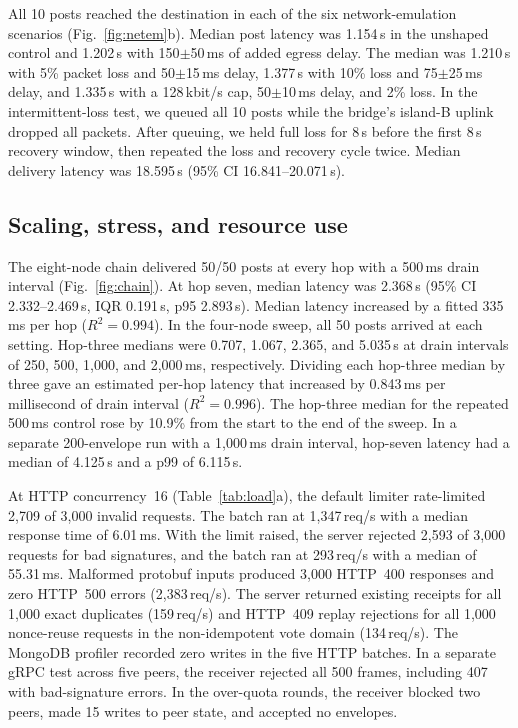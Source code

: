 \documentclass[conference,a4paper,10pt]{IEEEtran}
\begin{document}
All 10 posts reached the destination in each of the six network-emulation scenarios (Fig.~\ref{fig:netem}b). Median post latency was 1.154\,s in the unshaped control and 1.202\,s with 150$\pm$50\,ms of added egress delay. The median was 1.210\,s with 5\% packet loss and 50$\pm$15\,ms delay, 1.377\,s with 10\% loss and 75$\pm$25\,ms delay, and 1.335\,s with a 128\,kbit/s cap, 50$\pm$10\,ms delay, and 2\% loss. In the intermittent-loss test, we queued all 10 posts while the bridge's island-B uplink dropped all packets. After queuing, we held full loss for 8\,s before the first 8\,s recovery window, then repeated the loss and recovery cycle twice. Median delivery latency was 18.595\,s (95\% CI 16.841--20.071\,s).

\subsection{Scaling, stress, and resource use}

The eight-node chain delivered 50/50 posts at every hop with a 500\,ms drain interval (Fig.~\ref{fig:chain}). At hop seven, median latency was 2.368\,s (95\% CI 2.332--2.469\,s, IQR 0.191\,s, p95 2.893\,s). Median latency increased by a fitted 335\,ms per hop ($R^2 = 0.994$). In the four-node sweep, all 50 posts arrived at each setting. Hop-three medians were 0.707, 1.067, 2.365, and 5.035\,s at drain intervals of 250, 500, 1,000, and 2,000\,ms, respectively. Dividing each hop-three median by three gave an estimated per-hop latency that increased by 0.843\,ms per millisecond of drain interval ($R^2 = 0.996$). The hop-three median for the repeated 500\,ms control rose by 10.9\% from the start to the end of the sweep. In a separate 200-envelope run with a 1,000\,ms drain interval, hop-seven latency had a median of 4.125\,s and a p99 of 6.115\,s.

At HTTP concurrency~16 (Table~\ref{tab:load}a), the default limiter rate-limited 2,709 of 3,000 invalid requests. The batch ran at 1,347\,req/s with a median response time of 6.01\,ms. With the limit raised, the server rejected 2,593 of 3,000 requests for bad signatures, and the batch ran at 293\,req/s with a median of 55.31\,ms. Malformed protobuf inputs produced 3,000 HTTP~400 responses and zero HTTP~500 errors (2,383\,req/s). The server returned existing receipts for all 1,000 exact duplicates (159\,req/s) and HTTP~409 replay rejections for all 1,000 nonce-reuse requests in the non-idempotent vote domain (134\,req/s). The MongoDB profiler recorded zero writes in the five HTTP batches. In a separate gRPC test across five peers, the receiver rejected all 500 frames, including 407 with bad-signature errors. In the over-quota rounds, the receiver blocked two peers, made 15 writes to peer state, and accepted no envelopes.
\end{document}
